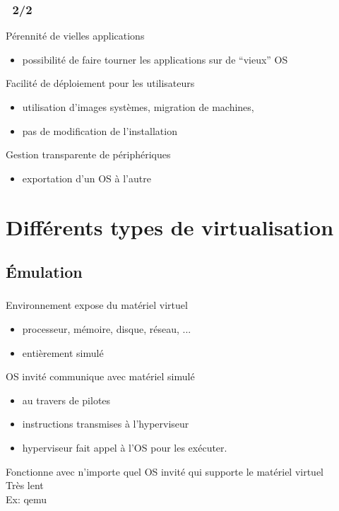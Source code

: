 \begin{frame}
\frametitle{\insertsection ~2/2}
  Pérennité de vielles applications 
  \begin{itemize}
  \item possibilité de faire tourner les applications sur de ``vieux'' OS
  \end{itemize}
  \vspace{0.5cm}
  Facilité de déploiement pour les utilisateurs
  \begin{itemize}
  \item utilisation d'images systèmes, migration de machines,
  \item pas de modification de l'installation   
  \end{itemize}
  \vspace{0.5cm}
  Gestion transparente de périphériques
  \begin{itemize}
  \item exportation d'un OS à l'autre
  \end{itemize}
\end{frame}


\section{Différents types de virtualisation}
\subsection{Émulation}
\begin{frame}
\frametitle{\insertsubsection}
Environnement expose du matériel virtuel 
\begin{itemize}
\item processeur, mémoire, disque, réseau, ...
\item entièrement simulé  
\end{itemize}

OS invité communique avec matériel simulé
\begin{itemize}
\item au travers de pilotes
\item instructions transmises à l’hyperviseur
\item[\ding{212}] hyperviseur fait appel à l'OS pour les exécuter.
\end{itemize}
\vspace{0.5cm}
 Fonctionne avec n'importe quel OS invité qui supporte le matériel virtuel\\
 Très lent\\
\vspace{0.2cm}
Ex: qemu
\end{frame}


